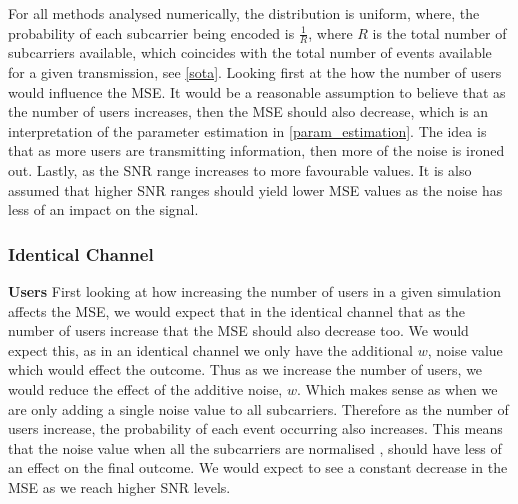 \documentclass{article}
\begin{document}
For all methods analysed numerically, the distribution is uniform, where, the probability of each subcarrier being encoded is $\frac{1}{R}$, where $R$ is the total number of subcarriers available, which coincides with the total number of events available for a given transmission, see \cref{sota}. 
Looking first at the how the number of users would influence the MSE. It would be a reasonable assumption to believe that as the number of users increases, then the MSE should also decrease, which is an interpretation of the parameter estimation in \cref{param_estimation}. The idea is that as more users are transmitting information, then more of the noise is ironed out. Lastly, as the SNR range increases to more favourable values. It is also assumed that higher SNR ranges should yield lower MSE values as the noise has less of an impact on the signal. 

\subsubsection{Identical Channel}

\textbf{Users}\newline
First looking at how increasing the number of users in a given simulation affects the \ac{MSE}, we would expect that in the identical channel that as the number of users increase that the  \ac{MSE} should also decrease too. We would expect this, as in an identical channel we only have the additional $w$, noise value which would effect the outcome. Thus as we increase the number of users, we would reduce the effect of the additive noise, $w$. Which makes sense as when we are only adding a single noise value to all subcarriers. Therefore as the number of users increase, the probability of each event occurring also increases. This means that the noise value when all the subcarriers are normalised , should have less of an effect on the final outcome.  We would expect to see a constant decrease in the MSE as we reach higher SNR levels. 
\end{document}
